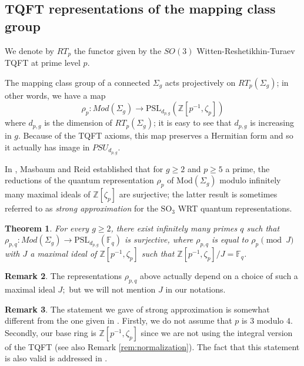 \documentclass[12pt]{amsart}
\newtheorem{thm}{Theorem}[section]
\theoremstyle{definition}
\newtheorem{rem}[thm]{Remark}
\newcommand{\ra}{\rightarrow}
\newcommand{\Z}{\mathbb{Z}}
\begin{document}
\subsection{TQFT representations of the mapping class group}
\label{sec:quantumRep}

We denote by $RT_p$ the functor given by the $SO(3)$ Witten-Reshetikhin-Turaev TQFT at prime level $p$.

The mapping class group of a connected $\Sigma_g$ acts projectively on $RT_p(\Sigma_g)$; in other words, we have a map $$\rho_p: Mod(\Sigma_g)\ra \mathrm{PSL}_{d_{p,g}}(\Z\left[p^{-1},\zeta_p\right])$$
where $d_{p,g}$ is the dimension of $RT_p(\Sigma_g)$; it is easy to see that $d_{p,g}$ is increasing in $g$. Because of the TQFT axioms, this map preserves a Hermitian form and so it actually has image in $PSU_{d_{p,g}}$.

In \cite{MR12}, Masbaum and Reid established that for $g\geq 2$ and $p\geq 5$ a prime, the reductions of the quantum representation $\rho_p$ of $\mathrm{Mod}(\Sigma_g)$ modulo infinitely many maximal ideals of $\Z[\zeta_p]$ are surjective; the latter result is sometimes referred to as \emph{strong approximation} for the $\mathrm{SO}_3$ WRT quantum representations.

\begin{thm}\cite[Theorem 1.2]{MR12}\label{thm:MasbaumReid}
	For every $g\geq 2$, there exist infinitely many primes $q$ such that $\rho_{p,q}: Mod(\Sigma_g)\ra \mathrm{PSL}_{d_{p,g}}(\mathbb{F}_q)$ is surjective, where $\rho_{p,q}$ is equal to $\rho_p \pmod{ J}$ with $J$ a maximal ideal of $\Z\left[p^{-1},\zeta_p\right]$ such that $\Z\left[p^{-1},\zeta_p\right]/J=\mathbb{F}_q$.
\end{thm}
\begin{rem}
	\label{rk:rho_pq} The representations $\rho_{p,q}$ above actually depend on a choice of such a maximal ideal $J;$ but we will not mention $J$ in our notations.
\end{rem}
\begin{rem}\label{rk:strongApprox}
	The statement we gave of strong approximation is somewhat different from the one given in \cite{MR12}. Firstly, we do not assume that $p$ is $3$ modulo $4$. Secondly, our base ring is $\Z\left[p^{-1},\zeta_p\right]$ since we are not using the integral version of the TQFT (see also Remark \ref{rem:normalization}). The fact that this statement is also valid is addressed in \cite[Remarks 3.1 and 3.5]{MR12}. 
\end{rem}
\end{document}
